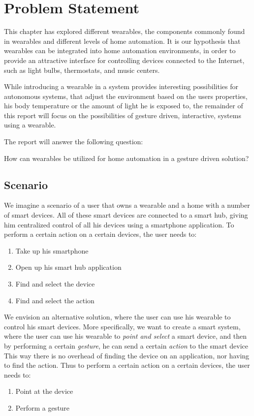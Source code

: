 \section{Problem Statement}\label{sec:researchstatement}
This chapter has explored different wearables, 
the components commonly found in wearables and different levels of home automation. 
It is our hypothesis that wearables can be integrated into home automation environments, 
in order to provide an attractive interface for controlling devices connected to the Internet, 
such as light bulbs, thermostats, and music centers.

While introducing a wearable in a system provides interesting possibilities for autonomous systems, 
that adjust the environment based on the users properties, 
\eg his body temperature or the amount of light he is exposed to,
the remainder of this report will focus on the possibilities of gesture driven, \ie interactive, systems using a wearable.

The report will answer the following question:

\begin{framed}
      How can wearables be utilized for home automation in a gesture driven solution?
\end{framed}

\subsection{Scenario}\label{sec:scenario}
We imagine a scenario of a user that owns a wearable and a home with a number of smart devices. 
All of these smart devices are connected to a smart hub, 
giving him centralized control of all his devices using \eg a smartphone application.
To perform a certain action on a certain devices, the user needs to:
\begin{enumerate}
  \item Take up his smartphone
  \item Open up his smart hub application
  \item Find and select the device
  \item Find and select the action
\end{enumerate}

We envision an alternative solution, 
where the user can use his wearable to control his smart devices. 
More specifically, we want to create a smart system, 
where the user can use his wearable to \emph{point and select} a smart device, 
and then by performing a certain \emph{gesture}, he can send a certain \emph{action} to the smart device
This way there is no overhead of finding the device on an application, 
nor having to find the action. 
Thus to perform a certain action on a certain devices, the user needs to:
\begin{enumerate}
  \item Point at the device
  \item Perform a gesture
\end{enumerate}

